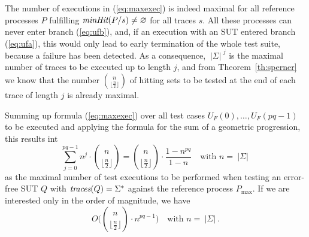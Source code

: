\documentclass[3p,times]{elsarticle}
\newcommand{\trc}{\text{\it traces}}
\newcommand{\minhits}{\text{\it minHit}}
\newcommand{\card}[1]{{~|\! #1\!|~}}
\newcommand{\pmax}{P_\text{max}}
\begin{document}
The number of executions in (\ref{eq:maxexec}) is indeed maximal for all
reference processes $P$ fulfilling $\minhits(P/s)\neq\varnothing$ for all
traces $s$. All these processes can never enter branch (\ref{eq:ufb}), and,
if an execution with an SUT entered branch (\ref{eq:ufa}), this would only
lead to early termination of the whole test suite, because a failure has been
detected. As a consequence, $\card{\Sigma}^{j}$ is the maximal number of
traces to be executed up to length $j$, and from Theorem~\ref{th:sperner} we
know that the number $\binom{n}{\lfloor\frac{n}{2}\rfloor}$ of hitting sets
to be tested at the end of each trace of length $j$ is already maximal.

Summing up  formula (\ref{eq:maxexec}) over all test cases
$U_F(0),\dots,U_F(pq-1)$ to be executed and applying the formula for the sum
of a geometric progression,  this results int
%
\begin{equation}\label{eq:pmaxcomplexity}
\sum_{j=0}^{pq-1} n^{j}\cdot \binom{n}{\lfloor\frac{n}{2}\rfloor}  =
\binom{n}{\lfloor\frac{n}{2}\rfloor}\cdot\frac{1-n^{pq}}{1-n}\quad\text{with $n=\card{\Sigma}$}
\end{equation}
%
as the maximal number of test executions to be performed when testing an
error-free SUT $Q$ with $\trc(Q) = \Sigma^*$ against the reference process
$\pmax$. If we are interested only in the order of magnitude, we have
%
\begin{equation}
\label{eq:maxO}
O\big(\binom{n}{\lfloor\frac{n}{2}\rfloor}\cdot n^{pq-1}\big)\quad\text{with $n=\card{\Sigma}$}.
\end{equation}

\end{document}
